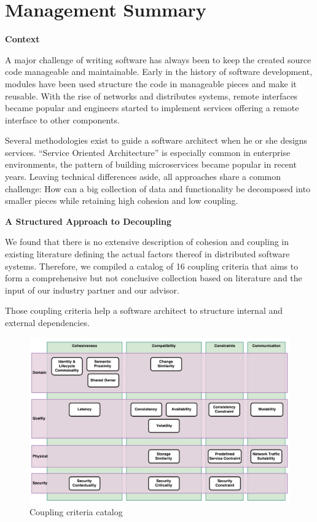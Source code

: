 \chapter{Management Summary}


\textbf{Context}

A major challenge of writing software has always been to keep the created source code manageable and maintainable. Early in the history of software development, modules have been used structure the code in manageable pieces and make it reusable. With the rise of networks and distributes systems, remote interfaces became popular and engineers started to implement services offering a remote interface to other components.

Several methodologies exist to guide a software architect when he or she designs services. \enquote{Service Oriented Architecture} is especially common in enterprise environments, the pattern of building microservices became popular in recent years. Leaving technical differences aside, all approaches share a common challenge: How can a big collection of data and functionality be decomposed into smaller pieces while retaining high cohesion and low coupling.

\textbf{A Structured Approach to Decoupling}

We found that there is no extensive description of cohesion and coupling in existing literature defining the actual factors thereof in distributed software systems. Therefore, we compiled a catalog of 16 coupling criteria that aims to form a comprehensive but not conclusive collection based on literature and the input of our industry partner and our advisor. 

Those coupling criteria help a software architect to structure internal and external dependencies. 

\begin{figure}[H]
	\centerline{\includegraphics[scale=0.5]{diagrams/CouplingCatalog.pdf}}
	\caption{Coupling criteria catalog}
	\label{fig:cc-catalog-mgmt-summary}
\end{figure}

